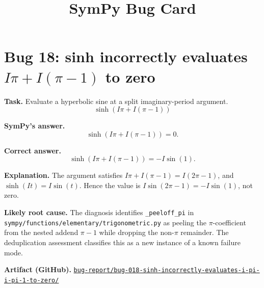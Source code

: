 \documentclass[11pt]{article}
\title{SymPy Bug Card}
\date{}
\newcommand{\artifactrepo}{https://github.com/TODO-org/TODO-repo}
\newcommand{\bugbundle}[1]{\href{\artifactrepo/tree/main/bug-report/#1}{\nolinkurl{bug-report/#1/}}}
\begin{document}
\author{}
\maketitle

\section*{Bug 18: sinh incorrectly evaluates \texorpdfstring{$I\pi+I(\pi-1)$}{I*pi + I*(pi - 1)} to zero}

\begin{counterexamplebox}
\textbf{Task.} Evaluate a hyperbolic sine at a split imaginary-period argument.
\[
\sinh(I\pi + I(\pi-1))
\]

\medskip
\textbf{SymPy's answer.}
\[
\sinh(I\pi + I(\pi-1)) = 0.
\]

\medskip
\textbf{Correct answer.}
\[
\sinh(I\pi + I(\pi-1)) = -I\sin(1).
\]

\medskip
\textbf{Explanation.} The argument satisfies
\(I\pi+I(\pi-1)=I(2\pi-1)\), and \(\sinh(It)=I\sin(t)\). Hence the value is
\(I\sin(2\pi-1)=-I\sin(1)\), not zero.

\medskip
\textbf{Likely root cause.} The diagnosis identifies
\texttt{\_peeloff\_pi} in \nolinkurl{sympy/functions/elementary/trigonometric.py}
as peeling the \(\pi\)-coefficient from the nested addend \(\pi-1\) while
dropping the non-\(\pi\) remainder. The deduplication assessment classifies this
as a new instance of a known failure mode.

\medskip
\textbf{Artifact (GitHub).} \bugbundle{bug-018-sinh-incorrectly-evaluates-i-pi-i-pi-1-to-zero}
\end{counterexamplebox}
\end{document}
